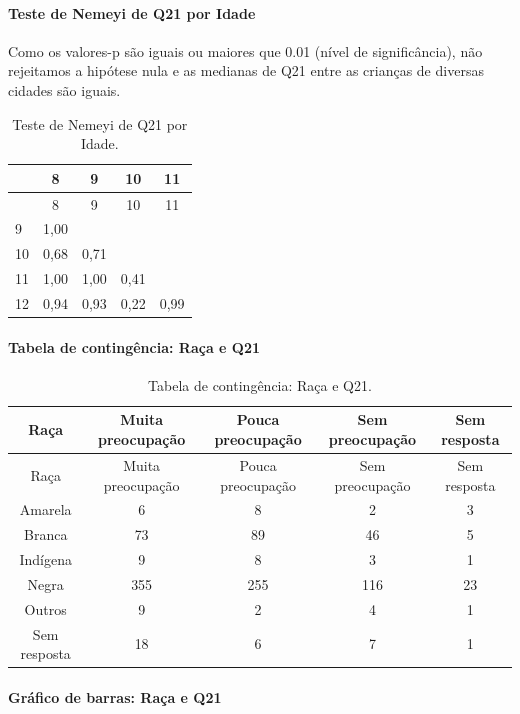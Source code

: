 \documentclass[]{article}
\let\oldparagraph\paragraph
\renewcommand{\paragraph}[1]{\oldparagraph{#1}\mbox{}}
\begin{document}
\hypertarget{teste-de-nemeyi-de-q21-por-idade}{%
\paragraph{Teste de Nemeyi de Q21 por Idade}\label{teste-de-nemeyi-de-q21-por-idade}}

Como os valores-p são iguais ou maiores que 0.01 (nível de significância), não rejeitamos a hipótese nula e as medianas de Q21 entre as crianças de diversas cidades são iguais.

\begin{longtable}[]{@{}lcccc@{}}
\caption{\label{tab:unnamed-chunk-454}Teste de Nemeyi de Q21 por Idade.}\tabularnewline
\toprule
& 8 & 9 & 10 & 11\tabularnewline
\midrule
\endfirsthead
\toprule
& 8 & 9 & 10 & 11\tabularnewline
\midrule
\endhead
9 & 1,00 & & &\tabularnewline
10 & 0,68 & 0,71 & &\tabularnewline
11 & 1,00 & 1,00 & 0,41 &\tabularnewline
12 & 0,94 & 0,93 & 0,22 & 0,99\tabularnewline
\bottomrule
\end{longtable}

\cleardoublepage

\hypertarget{tabela-de-continguxeancia-rauxe7a-e-q21}{%
\paragraph{Tabela de contingência: Raça e Q21}\label{tabela-de-continguxeancia-rauxe7a-e-q21}}

\begin{longtable}[]{@{}ccccc@{}}
\caption{\label{tab:unnamed-chunk-455}Tabela de contingência: Raça e Q21.}\tabularnewline
\toprule
Raça & Muita preocupação & Pouca preocupação & Sem preocupação & Sem resposta\tabularnewline
\midrule
\endfirsthead
\toprule
Raça & Muita preocupação & Pouca preocupação & Sem preocupação & Sem resposta\tabularnewline
\midrule
\endhead
Amarela & 6 & 8 & 2 & 3\tabularnewline
Branca & 73 & 89 & 46 & 5\tabularnewline
Indígena & 9 & 8 & 3 & 1\tabularnewline
Negra & 355 & 255 & 116 & 23\tabularnewline
Outros & 9 & 2 & 4 & 1\tabularnewline
Sem resposta & 18 & 6 & 7 & 1\tabularnewline
\bottomrule
\end{longtable}

\hypertarget{gruxe1fico-de-barras-rauxe7a-e-q21}{%
\paragraph{Gráfico de barras: Raça e Q21}\label{gruxe1fico-de-barras-rauxe7a-e-q21}}
\end{document}
